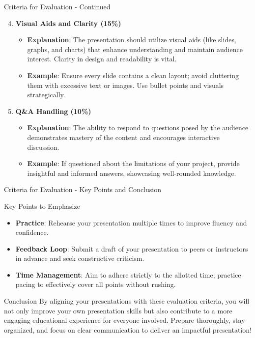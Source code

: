 \documentclass[aspectratio=169]{beamer}
\begin{document}
\begin{frame}[fragile]{Criteria for Evaluation - Continued}
    \begin{enumerate} 
        \setcounter{enumi}{3}
        \item \textbf{Visual Aids and Clarity (15\%)}
            \begin{itemize}
                \item \textbf{Explanation}: The presentation should utilize visual aids (like slides, graphs, and charts) that enhance understanding and maintain audience interest. Clarity in design and readability is vital.
                \item \textbf{Example}: Ensure every slide contains a clean layout; avoid cluttering them with excessive text or images. Use bullet points and visuals strategically.
            \end{itemize}

        \item \textbf{Q\&A Handling (10\%)}
            \begin{itemize}
                \item \textbf{Explanation}: The ability to respond to questions posed by the audience demonstrates mastery of the content and encourages interactive discussion.
                \item \textbf{Example}: If questioned about the limitations of your project, provide insightful and informed answers, showcasing well-rounded knowledge.
            \end{itemize}
    \end{enumerate}
\end{frame}

\begin{frame}[fragile]{Criteria for Evaluation - Key Points and Conclusion}
    \begin{block}{Key Points to Emphasize}
        \begin{itemize}
            \item \textbf{Practice}: Rehearse your presentation multiple times to improve fluency and confidence.
            \item \textbf{Feedback Loop}: Submit a draft of your presentation to peers or instructors in advance and seek constructive criticism.
            \item \textbf{Time Management}: Aim to adhere strictly to the allotted time; practice pacing to effectively cover all points without rushing.
        \end{itemize}
    \end{block}

    \begin{block}{Conclusion}
        By aligning your presentations with these evaluation criteria, you will not only improve your own presentation skills but also contribute to a more engaging educational experience for everyone involved. Prepare thoroughly, stay organized, and focus on clear communication to deliver an impactful presentation!
    \end{block}
\end{frame}
\end{document}
